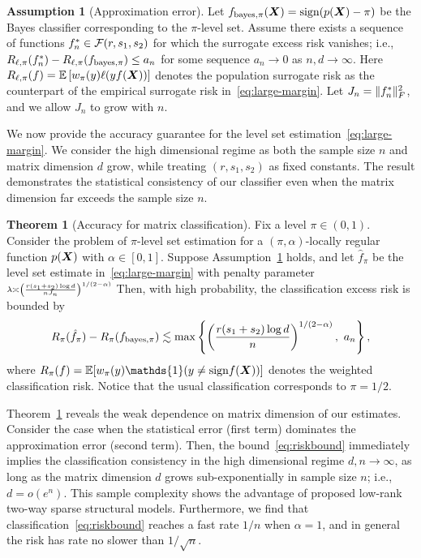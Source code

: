\documentclass[11pt]{article}
\theoremstyle{definition}
\newtheorem{thm}{Theorem}[section]
\newtheorem{assumption}{Assumption}
\def\sign{\textup{sign}}
\def\bayespif{f_{\textup{bayes},\pi}}
\begin{document}
\begin{assumption}[Approximation error]\label{ass:main} 
Let $f_{\text{bayes},\pi}(\mX)=\sign(p(\mX) -\pi)$ be the Bayes classifier corresponding to the $\pi$-level set. Assume there exists a sequence of functions $f_n^*\in\mathcal{F}(r,s_1,s_2)$ for which the surrogate excess risk vanishes; i.e., $R_{\ell,\pi}(f^*_n)-R_{\ell,\pi}(\bayespif)\leq a_n$ for some sequence $a_n\to 0$ as $n,d\to \infty$. Here $R_{\ell,\pi}(f)=\mathbb{E}\left[w_\pi(y)\ell(yf(\bm X))\right]$ denotes the population surrogate risk as the counterpart of the empirical surrogate risk in~\eqref{eq:large-margin}. Let $J_n=\lVert f^*_n\rVert_F^2$, and we allow $J_n$ to grow with $n$. 
\end{assumption}

We now provide the accuracy guarantee for the level set estimation~\eqref{eq:large-margin}. We consider the high dimensional regime as both the sample size $n$ and matrix dimension $d$ grow, while treating $(r,s_1,s_2)$ as fixed constants. The result demonstrates the statistical consistency of our classifier even when the matrix dimension far exceeds the sample size $n$. 

\begin{thm}[Accuracy for matrix classification]\label{thm:main} Fix a level $\pi\in(0,1)$. Consider the problem of $\pi$-level set estimation for a $(\pi,\alpha)$-locally regular function $p(\bm X)$ with $\alpha\in[0,1]$. Suppose Assumption~\ref{ass:main} holds, and let $\hat f_\pi$ be the level set estimate in~\eqref{eq:large-margin} with penalty parameter $\scriptstyle\lambda\asymp \left( r( s_1+s_2)\log d \over  nJ_n\right)^{1/(2-\alpha)}$ Then, with high probability, the classification excess risk is bounded by 
\begin{equation}\label{eq:riskbound}
 R_{\pi}( \hat f_\pi)-R_{\pi}(\bayespif) \lesssim \max\left\{\left({r(s_1+s_2)\log d \over n}\right)^{1/(2-\alpha)},\ a_n\right\},
\end{equation}
where $R_{\pi}(f)=\mathbb{E}[w_\pi(y)\mathds{1}(y\neq \sign f(\mX))]$ denotes the weighted classification risk. Notice that the usual classification corresponds to $\pi = 1/2$. 

\end{thm}

Theorem~\ref{thm:main} reveals the weak dependence on matrix dimension of our estimates. Consider the case when the statistical error (first term) dominates the approximation error (second term). Then, the bound~\eqref{eq:riskbound} immediately implies the classification consistency in the high dimensional regime $d,n\to \infty$, as long as the matrix dimension $d$ grows sub-exponentially in sample size $n$; i.e., $d=o(e^n)$. This sample complexity shows the advantage of proposed low-rank two-way sparse structural models. Furthermore, we find that classification~\eqref{eq:riskbound} reaches a fast rate $1/n$ when $\alpha=1$, and in general the risk has rate no slower than $1/\sqrt{n}$. 
\end{document}
